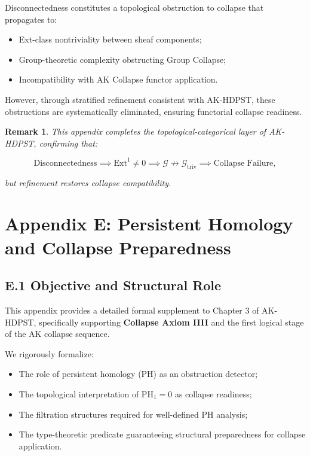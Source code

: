 \documentclass[11pt]{article}
\newtheorem{remark}[theorem]{Remark}
\begin{document}
Disconnectedness constitutes a topological obstruction to collapse that propagates to:

\begin{itemize}
    \item Ext-class nontriviality between sheaf components;
    \item Group-theoretic complexity obstructing Group Collapse;
    \item Incompatibility with AK Collapse functor application.
\end{itemize}

However, through stratified refinement consistent with AK-HDPST, these obstructions are systematically eliminated, ensuring functorial collapse readiness.

\begin{remark}
This appendix completes the topological-categorical layer of AK-HDPST, confirming that:

\[
\text{Disconnectedness} \implies \mathrm{Ext}^1 \neq 0 \implies \mathcal{G} \not\rightarrow \mathcal{G}_{\mathrm{triv}} \implies \text{Collapse Failure},
\]

but refinement restores collapse compatibility.

\end{remark}



\section*{Appendix E: Persistent Homology and Collapse Preparedness}

\subsection*{E.1 Objective and Structural Role}

This appendix provides a detailed formal supplement to Chapter 3 of AK-HDPST, specifically supporting \textbf{Collapse Axiom IIII} and the first logical stage of the AK collapse sequence.

We rigorously formalize:

\begin{itemize}
    \item The role of persistent homology (PH) as an obstruction detector;
    \item The topological interpretation of \( \mathrm{PH}_1 = 0 \) as collapse readiness;
    \item The filtration structures required for well-defined PH analysis;
    \item The type-theoretic predicate guaranteeing structural preparedness for collapse application.
\end{itemize}
\end{document}
